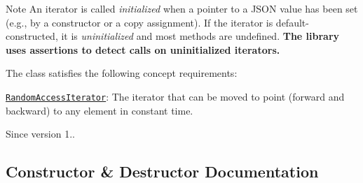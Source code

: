 \begin{DoxyNote}{Note}
An iterator is called {\itshape initialized} when a pointer to a J\+S\+ON value has been set (e.\+g., by a constructor or a copy assignment). If the iterator is default-\/constructed, it is {\itshape uninitialized} and most methods are undefined. {\bfseries The library uses assertions to detect calls on uninitialized iterators.}
\end{DoxyNote}
The class satisfies the following concept requirements\+:
\begin{DoxyItemize}
\item \href{http://en.cppreference.com/w/cpp/concept/RandomAccessIterator}{\tt Random\+Access\+Iterator}\+: The iterator that can be moved to point (forward and backward) to any element in constant time.
\end{DoxyItemize}

\begin{DoxySince}{Since}
version 1.. 
\end{DoxySince}


\subsection{Constructor \& Destructor Documentation}
\mbox{\label{classnlohmann_1_1basic__json_1_1const__iterator_a23de834b11bd895209aa65c100ab9ceb}} 
